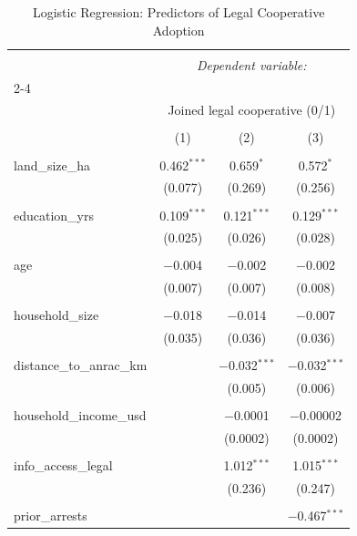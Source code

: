 
\begin{table}[!htbp] \centering 
  \caption{Logistic Regression: Predictors of Legal Cooperative Adoption} 
  \label{} 
\begin{tabular}{@{\extracolsep{5pt}}lccc} 
\\[-1.8ex]\hline 
\hline \\[-1.8ex] 
 & \multicolumn{3}{c}{\textit{Dependent variable:}} \\ 
\cline{2-4} 
\\[-1.8ex] & \multicolumn{3}{c}{Joined legal cooperative (0/1)} \\ 
\\[-1.8ex] & (1) & (2) & (3)\\ 
\hline \\[-1.8ex] 
 land\_size\_ha & 0.462$^{***}$ & 0.659$^{*}$ & 0.572$^{*}$ \\ 
  & (0.077) & (0.269) & (0.256) \\ 
  & & & \\ 
 education\_yrs & 0.109$^{***}$ & 0.121$^{***}$ & 0.129$^{***}$ \\ 
  & (0.025) & (0.026) & (0.028) \\ 
  & & & \\ 
 age & $-$0.004 & $-$0.002 & $-$0.002 \\ 
  & (0.007) & (0.007) & (0.008) \\ 
  & & & \\ 
 household\_size & $-$0.018 & $-$0.014 & $-$0.007 \\ 
  & (0.035) & (0.036) & (0.036) \\ 
  & & & \\ 
 distance\_to\_anrac\_km &  & $-$0.032$^{***}$ & $-$0.032$^{***}$ \\ 
  &  & (0.005) & (0.006) \\ 
  & & & \\ 
 household\_income\_usd &  & $-$0.0001 & $-$0.00002 \\ 
  &  & (0.0002) & (0.0002) \\ 
  & & & \\ 
 info\_access\_legal &  & 1.012$^{***}$ & 1.015$^{***}$ \\ 
  &  & (0.236) & (0.247) \\ 
  & & & \\ 
 prior\_arrests &  &  & $-$0.467$^{***}$ \\ 

\end{tabular}
\end{table}
